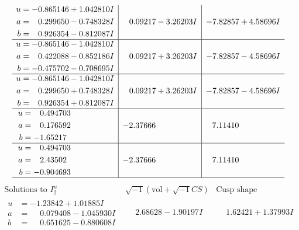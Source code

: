 \documentclass[1p]{elsarticle_modified}
\theoremstyle{definition}
\newcommand{\I}{\sqrt{-1}}
\begin{document}
$$\begin{array}{c|c|c}
\begin{aligned}
u &= -0.865146 + 1.042810 I \\
a &= \phantom{-}0.299650 - 0.748328 I \\
b &= \phantom{-}0.926354 - 0.812087 I\end{aligned}
 & \phantom{-}0.09217 - 3.26203 I & -7.82857 + 4.58696 I \\ \hline\begin{aligned}
u &= -0.865146 - 1.042810 I \\
a &= \phantom{-}0.422088 - 0.852186 I \\
b &= -0.475702 - 0.708695 I\end{aligned}
 & \phantom{-}0.09217 + 3.26203 I & -7.82857 - 4.58696 I \\ \hline\begin{aligned}
u &= -0.865146 - 1.042810 I \\
a &= \phantom{-}0.299650 + 0.748328 I \\
b &= \phantom{-}0.926354 + 0.812087 I\end{aligned}
 & \phantom{-}0.09217 + 3.26203 I & -7.82857 - 4.58696 I \\ \hline\begin{aligned}
u &= \phantom{-}0.494703\phantom{ +0.000000I} \\
a &= \phantom{-}0.176592\phantom{ +0.000000I} \\
b &= -1.65217\phantom{ +0.000000I}\end{aligned}
 & -2.37666\phantom{ +0.000000I} & \phantom{-}7.11410\phantom{ +0.000000I} \\ \hline\begin{aligned}
u &= \phantom{-}0.494703\phantom{ +0.000000I} \\
a &= \phantom{-}2.43502\phantom{ +0.000000I} \\
b &= -0.904693\phantom{ +0.000000I}\end{aligned}
 & -2.37666\phantom{ +0.000000I} & \phantom{-}7.11410\phantom{ +0.000000I}\\
 \hline 
 \end{array}$$\newpage$$\begin{array}{c|c|c}  
\text{Solutions to }I^u_{2}& \I (\text{vol} + \sqrt{-1}CS) & \text{Cusp shape}\\
 \hline 
\begin{aligned}
u &= -1.23842 + 1.01885 I \\
a &= \phantom{-}0.079408 - 1.045930 I \\
b &= \phantom{-}0.651625 - 0.880608 I\end{aligned}
 & \phantom{-}2.68628 - 1.90197 I & \phantom{-}1.62421 + 1.37993 I \\ \hline\begin{aligned}

\end{aligned}
\end{array}$$
\end{document}
